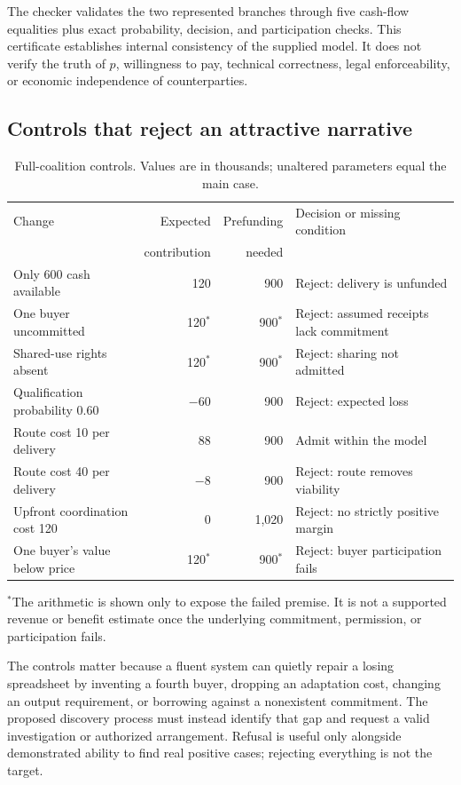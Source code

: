 \documentclass[11pt,letterpaper]{article}
\theoremstyle{remark}\newtheorem{remark}{Remark}[section]
\begin{document}
The checker validates the two represented branches through five cash-flow equalities plus exact probability, decision, and participation checks. This certificate establishes internal consistency of the supplied model. It does not verify the truth of $p$, willingness to pay, technical correctness, legal enforceability, or economic independence of counterparties.

\subsection{Controls that reject an attractive narrative}
\begin{table}[htbp]\centering\small
\caption{Full-coalition controls. Values are in thousands; unaltered parameters equal the main case.}\label{tab:controls}
\begin{tabularx}{\linewidth}{@{}YrrP{.29\linewidth}@{}}\toprule
Change & Expected & Prefunding & Decision or missing condition\\
 & contribution & needed & \\\midrule
Only 600 cash available & 120 & 900 & Reject: delivery is unfunded\\
One buyer uncommitted & 120$^*$ & 900$^*$ & Reject: assumed receipts lack commitment\\
Shared-use rights absent & 120$^*$ & 900$^*$ & Reject: sharing not admitted\\
Qualification probability 0.60 & $-60$ & 900 & Reject: expected loss\\
Route cost 10 per delivery & 88 & 900 & Admit within the model\\
Route cost 40 per delivery & $-8$ & 900 & Reject: route removes viability\\
Upfront coordination cost 120 & 0 & 1,020 & Reject: no strictly positive margin\\
One buyer's value below price & 120$^*$ & 900$^*$ & Reject: buyer participation fails\\\bottomrule
\end{tabularx}
\smallskip\parbox{.96\linewidth}{\footnotesize $^*$The arithmetic is shown only to expose the failed premise. It is not a supported revenue or benefit estimate once the underlying commitment, permission, or participation fails.}
\end{table}

The controls matter because a fluent system can quietly repair a losing spreadsheet by inventing a fourth buyer, dropping an adaptation cost, changing an output requirement, or borrowing against a nonexistent commitment. The proposed discovery process must instead identify that gap and request a valid investigation or authorized arrangement. Refusal is useful only alongside demonstrated ability to find real positive cases; rejecting everything is not the target.
\end{document}
